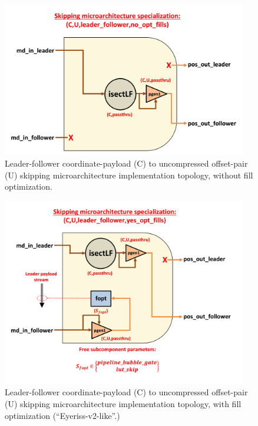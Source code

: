 \begin{figure}[H]
    \centering
    \includegraphics[width=0.95\textwidth]{figures/SKIP_C_U_leader_follower_no_opt_fills.png}
    \caption{Leader-follower coordinate-payload (C) to uncompressed offset-pair (U) skipping microarchitecture implementation topology, without fill optimization.}
    \label{fig:SKIP_C_U_leader_follower_no_opt_fills}
\end{figure}

\begin{figure}[H]
    \centering
    \includegraphics[width=0.95\textwidth]{figures/SKIP_C_U_leader_follower_yes_opt_fills.png}
    \caption{Leader-follower coordinate-payload (C) to uncompressed offset-pair (U) skipping microarchitecture implementation topology, with fill optimization (``Eyeriss-v2-like''\cite{eyerissv2}.)}
    \label{fig:SKIP_C_U_leader_follower_yes_opt_fills}
\end{figure}